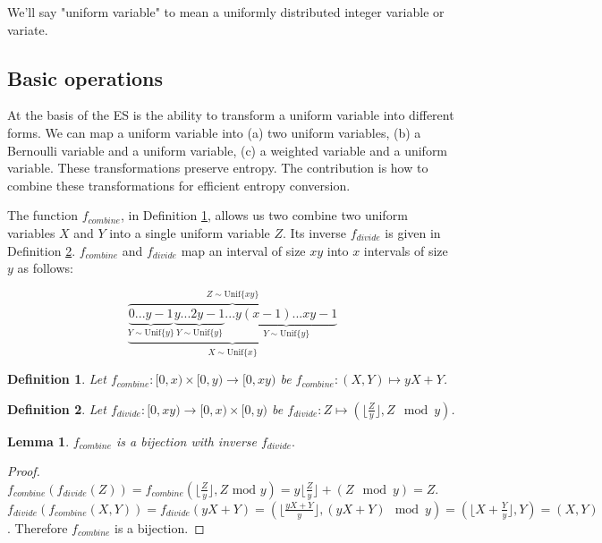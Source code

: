 \documentclass[lettersize,journal]{IEEEtran}
\newtheorem{lemma}{Lemma}
\newtheorem{definition}{Definition}
\newcommand{\unif}[1]{\mathrm{Unif}\{#1\}}
\begin{document}
We'll say "uniform variable" to mean a uniformly distributed integer variable or variate.


\subsection{Basic operations}

At the basis of the ES is the ability to transform a uniform variable into different forms.  We can map a uniform variable into (a) two uniform variables, (b) a Bernoulli variable and a uniform variable, (c) a weighted variable and a uniform variable. These transformations preserve entropy. The contribution is how to combine these transformations for efficient entropy conversion.

The function $f_{combine}$, in Definition \ref{def:combine}, allows us two combine two uniform variables $X$ and $Y$ into a single uniform variable $Z$. Its inverse $f_{divide}$ is given in Definition \ref{def:divide}. $f_{combine}$ and $f_{divide}$ map an interval of size $xy$ into $x$ intervals of size $y$ as follows:

\[
\overbrace{    
    \underbrace{
        \underbrace{0 ... y-1}_{Y \sim \unif{y}}
        \underbrace{y ... 2y-1}_{Y \sim \unif{y}}
        ...
        \underbrace{y(x-1)...xy-1}_{Y \sim \unif{y}}    
    }}_{X \sim \unif{x}}
^{Z \sim \unif{xy}}
\]

\begin{definition}
    Let $f_{combine}: [0,x)\times [0,y) \rightarrow [0,xy)$ be $f_{combine}: (X,Y) \mapsto yX+Y$.
    \label{def:combine}
\end{definition}

\begin{definition}
    Let $f_{divide}: [0,xy) \rightarrow [0,x) \times [0,y)$ be $f_{divide}: Z \mapsto (\lfloor \frac{Z}{y} \rfloor, Z \mod y)$.
    \label{def:divide}
\end{definition}

\begin{lemma}
    $f_{combine}$ is a bijection with inverse $f_{divide}.$
\end{lemma}

\begin{proof}
    $f_{combine}(f_{divide}(Z)) = f_{combine}(\lfloor \frac{Z}{y}\rfloor, Z \text{ mod } y) = y\lfloor \frac{Z}{y} \rfloor + (Z \mod y) = Z$. $f_{divide}(f_{combine}(X,Y)) = f_{divide}(yX+Y) = (\lfloor\frac{yX+Y}{y}\rfloor, (yX+Y)\mod y) = (\lfloor X+\frac{Y}{y}\rfloor, Y) = (X,Y)$. Therefore $f_{combine}$ is a bijection.
\end{proof}
\end{document}
